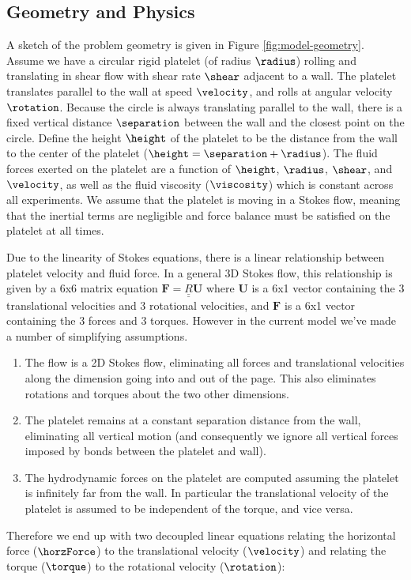 \subsection{Geometry and Physics}
\label{sec:geometry-physics}

A sketch of the problem geometry is given in Figure
\ref{fig:model-geometry}. Assume we have a circular rigid platelet (of
radius $\radius$) rolling and translating in shear flow with shear
rate $\shear$ adjacent to a wall. The platelet translates parallel to
the wall at speed $\velocity$, and rolls at angular velocity
$\rotation$. Because the circle is always translating parallel to the
wall, there is a fixed vertical distance $\separation$ between the
wall and the closest point on the circle. Define the height $\height$
of the platelet to be the distance from the wall to the center of the
platelet ($\height = \separation + \radius$). The fluid forces exerted
on the platelet are a function of $\height$, $\radius$, $\shear$, and
$\velocity$, as well as the fluid viscosity ($\viscosity$) which is
constant across all experiments. We assume that the platelet is moving
in a Stokes flow, meaning that the inertial terms are negligible and
force balance must be satisfied on the platelet at all times.

Due to the linearity of Stokes equations, there is a linear
relationship between platelet velocity and fluid force. In a general
3D Stokes flow, this relationship is given by a 6x6 matrix equation
$\mathbf{F} = \underline{\underline{R}} \mathbf{U}$ where $\mathbf{U}$
is a 6x1 vector containing the 3 translational velocities and 3
rotational velocities, and $\mathbf{F}$ is a 6x1 vector containing the
3 forces and 3 torques. However in the current model we've made a
number of simplifying assumptions. 
\begin{enumerate}
\item The flow is a 2D Stokes flow, eliminating all forces and
  translational velocities along the dimension going into and out of
  the page. This also eliminates rotations and torques about the two
  other dimensions.
\item The platelet remains at a constant separation distance from the
  wall, eliminating all vertical motion (and consequently we ignore
  all vertical forces imposed by bonds between the platelet and
  wall).
\item The hydrodynamic forces on the platelet are computed assuming
  the platelet is infinitely far from the wall. In particular the
  translational velocity of the platelet is assumed to be independent
  of the torque, and vice versa.
\end{enumerate}
Therefore we end up with two decoupled linear equations relating the
horizontal force ($\horzForce$) to the translational velocity
($\velocity$) and relating the torque ($\torque$) to the rotational
velocity ($\rotation$):

